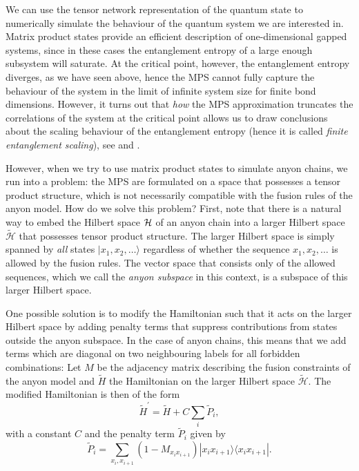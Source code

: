 We can use the tensor network representation of the quantum state to numerically simulate the behaviour of the quantum system we are interested in. Matrix product states provide an efficient description of one-dimensional gapped systems, since in these cases the entanglement entropy of a large enough subsystem will saturate. At the critical point, however, the entanglement entropy diverges, as we have seen above, hence the MPS cannot fully capture the behaviour of the system in the limit of infinite system size for finite bond dimensions. However, it turns out that \emph{how} the MPS approximation truncates the correlations of the system at the critical point allows us to draw conclusions about the scaling behaviour of the entanglement entropy (hence it is called \emph{finite entanglement scaling}), see \cite{Tagliacozzo2008} and \cite{Haegeman2011}.

However, when we try to use matrix product states to simulate anyon chains, we run into a problem: the MPS are formulated on a space that possesses a tensor product structure, which is not necessarily compatible with the fusion rules of the anyon model. How do we solve this problem? First, note that there is a natural way to embed the Hilbert space ${\mathcal{H}}$ of an anyon chain into a larger Hilbert space $\tilde{\mathcal{H}}$ that possesses tensor product structure. The larger Hilbert space is simply spanned by \emph{all} states $|x_1,x_2,\dots\rangle$ regardless of whether the sequence $x_1,x_2,\dots$ is allowed by the fusion rules. The vector space that consists only of the allowed sequences, which we call the \emph{anyon subspace} in this context, is a subspace of this larger Hilbert space.

One possible solution is to modify the Hamiltonian such that it acts on the larger Hilbert space by adding penalty terms that suppress contributions from states outside the anyon subspace. In the case of anyon chains, this means that we add terms which are diagonal on two neighbouring labels for all forbidden combinations: Let $M$ be the adjacency matrix describing the fusion constraints of the anyon model and $\tilde{H}$ the Hamiltonian on the larger Hilbert space $\tilde{\mathcal{H}}$. The modified Hamiltonian is then of the form
	\begin{equation}
	\label{eq:penaltyham}
		\tilde{H}^\prime=\tilde{H}+C\sum_i\tilde{P}_i,
	\end{equation}
with a constant $C$ and the penalty term $\tilde{P}_i$ given by
	\begin{equation}
		\tilde{P}_i=\sum_{x_i,x_{i+1}}\left(1-M_{x_ix_{i+1}}\right)|x_ix_{i+1}\rangle\langle x_ix_{i+1}|.
	\end{equation}

